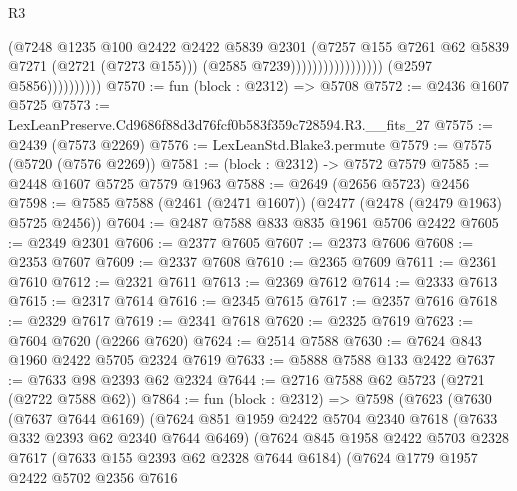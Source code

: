 \begin{lexlean}{R3}
\begin{coremodule}
                                                    (@7248
                                                      @1235
                                                      @100
                                                      @2422
                                                      @2422
                                                      @5839
                                                      @2301
                                                      (@7257
                                                        @155
                                                        @7261
                                                        @62
                                                        @5839
                                                        @7271
                                                        (@2721 (@7273 @155)))
                                                      (@2585 @7239)))))))))))))))))
                      (@2597 @5856))))))))))
@7570 := fun (block : @2312) => @5708
@7572 := @2436 @1607 @5725
@7573 := LexLeanPreserve.Cd9686f88d3d76fcf0b583f359c728594.R3.__fits_27
@7575 := @2439 (@7573 @2269)
@7576 := LexLeanStd.Blake3.permute
@7579 := @7575 (@5720 (@7576 @2269))
@7581 := (block : @2312) -> @7572 @7579
@7585 := @2448 @1607 @5725 @7579 @1963
@7588 := @2649 (@2656 @5723) @2456
@7598 := @7585 @7588 (@2461 (@2471 @1607)) (@2477 (@2478 (@2479 @1963) @5725 @2456))
@7604 := @2487 @7588 @833 @835 @1961 @5706 @2422
@7605 := @2349 @2301
@7606 := @2377 @7605
@7607 := @2373 @7606
@7608 := @2353 @7607
@7609 := @2337 @7608
@7610 := @2365 @7609
@7611 := @2361 @7610
@7612 := @2321 @7611
@7613 := @2369 @7612
@7614 := @2333 @7613
@7615 := @2317 @7614
@7616 := @2345 @7615
@7617 := @2357 @7616
@7618 := @2329 @7617
@7619 := @2341 @7618
@7620 := @2325 @7619
@7623 := @7604 @7620 (@2266 @7620)
@7624 := @2514 @7588
@7630 := @7624 @843 @1960 @2422 @5705 @2324 @7619
@7633 := @5888 @7588 @133 @2422
@7637 := @7633 @98 @2393 @62 @2324
@7644 := @2716 @7588 @62 @5723 (@2721 (@2722 @7588 @62))
@7864 := fun (block : @2312) =>
  @7598
    (@7623
      (@7630
        (@7637 @7644 @6169)
        (@7624
          @851
          @1959
          @2422
          @5704
          @2340
          @7618
          (@7633 @332 @2393 @62 @2340 @7644 @6469)
          (@7624
            @845
            @1958
            @2422
            @5703
            @2328
            @7617
            (@7633 @155 @2393 @62 @2328 @7644 @6184)
            (@7624
              @1779
              @1957
              @2422
              @5702
              @2356
              @7616

\end{coremodule}
\end{lexlean}
